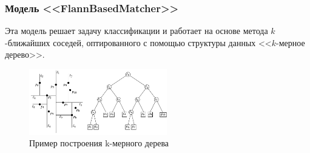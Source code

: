 \documentclass[t]{beamer}
\begin{document}
	\begin{frame}
		\frametitle{Модель <<FlannBasedMatcher>>}
		
		Эта модель решает задачу классификации и работает на основе метода $k$-ближайших соседей, оптированного с помощью структуры данных <<$k$-мерное дерево>>.
		\begin{figure}[h!]
			\centering
			\includegraphics[width = 6cm]{image/chapter_2/kdtreeexample}	
			\caption{Пример построения k-мерного дерева}
			\label{fig:kdtreeexample}
		\end{figure}
	\end{frame}
	
\end{document}
